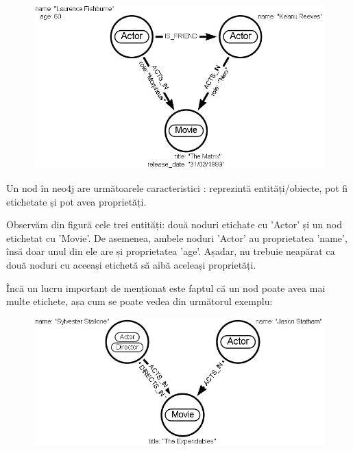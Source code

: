 \documentclass[12pt,a4paper]{report}
\begin{document}
\begin{figure}[H]
\centering
\caption{}
\begin{adjustbox}{max size={\textwidth}{\textheight}}
\includegraphics[scale=0.5]{exemplu_1_neo4j}
\end{adjustbox}
\caption*{}
\end{figure}


Un nod în neo4j are următoarele caracteristici \cite{6}: reprezintă entități/obiecte, pot fi etichetate și pot avea proprietăți.

Observăm din figură cele trei entități: două noduri etichate cu 'Actor' și un nod etichetat cu 'Movie'. De asemenea, ambele noduri 'Actor' au proprietatea 'name', însă doar unul din ele are și proprietatea 'age'. Așadar, nu trebuie neapărat ca două noduri cu aceeași etichetă să aibă aceleași proprietăți.

Încă un lucru important de menționat este faptul că un nod poate avea mai multe etichete, așa cum se poate vedea din următorul exemplu:


\begin{figure}[H]
\centering
\caption{}
\begin{adjustbox}{max size={\textwidth}{\textheight}}
\includegraphics[scale=0.5]{exemplu_2_neo4j}
\end{adjustbox}
\caption*{}
\end{figure}
\end{document}
